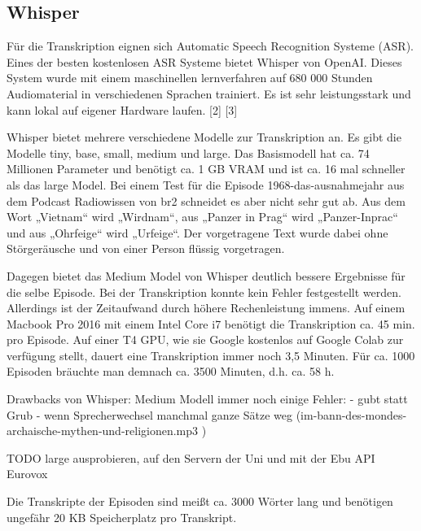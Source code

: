 \subsection{Whisper}

Für die Transkription eignen sich Automatic Speech Recognition Systeme (ASR). 
Eines der besten kostenlosen ASR Systeme bietet Whisper von OpenAI. 
Dieses System wurde mit einem maschinellen lernverfahren auf 680 000 Stunden Audiomaterial in verschiedenen Sprachen trainiert. 
Es ist sehr leistungsstark und kann lokal auf eigener Hardware laufen. [2] [3]

Whisper bietet mehrere verschiedene Modelle zur Transkription an. Es gibt die Modelle tiny, base, small, medium und large. 
Das Basismodell hat ca. 74 Millionen Parameter und benötigt ca. 1 GB VRAM und ist ca. 16 mal schneller als das large Model. 
Bei einem Test für die Episode 1968-das-ausnahmejahr aus dem Podcast Radiowissen von br2 schneidet es aber nicht sehr gut ab. 
Aus dem Wort „Vietnam“ wird „Wirdnam“, aus „Panzer in Prag“ wird „Panzer-Inprac“ und aus  „Ohrfeige“ wird „Urfeige“. 
Der vorgetragene Text wurde dabei ohne Störgeräusche und von einer Person flüssig vorgetragen. 

Dagegen bietet das Medium Model von Whisper deutlich bessere Ergebnisse für die selbe Episode. 
Bei der Transkription konnte kein Fehler festgestellt werden. Allerdings ist der Zeitaufwand durch höhere Rechenleistung immens. 
Auf einem Macbook Pro 2016 mit einem Intel Core i7 benötigt die Transkription ca. 45 min. pro Episode. 
Auf einer T4 GPU, wie sie Google kostenlos auf Google Colab zur verfügung stellt, dauert eine Transkription immer noch 3,5 Minuten. 
Für ca. 1000 Episoden bräuchte man demnach ca. 3500 Minuten, d.h. ca. 58 h. 

Drawbacks von Whisper:
Medium Modell immer noch einige Fehler: 
- gubt statt Grub
- wenn Sprecherwechsel manchmal ganze Sätze weg (im-bann-des-mondes-archaische-mythen-und-religionen.mp3	)

TODO large ausprobieren, auf den Servern der Uni und mit der Ebu API
Eurovox


Die Transkripte der Episoden sind meißt ca. 3000 Wörter lang und benötigen ungefähr 20 KB Speicherplatz pro Transkript.

